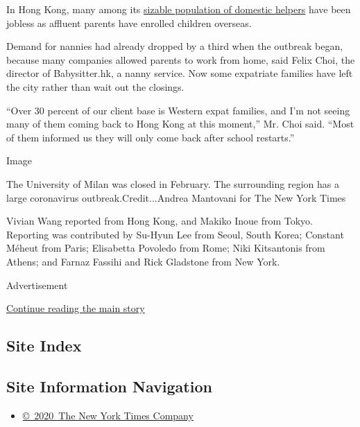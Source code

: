 In Hong Kong, many among its
\href{https://www.legco.gov.hk/research-publications/english/1617rb04-foreign-domestic-helpers-and-evolving-care-duties-in-hong-kong-20170720-e.pdf}{sizable
population of domestic helpers} have been jobless as affluent parents
have enrolled children overseas.

Demand for nannies had already dropped by a third when the outbreak
began, because many companies allowed parents to work from home, said
Felix Choi, the director of Babysitter.hk, a nanny service. Now some
expatriate families have left the city rather than wait out the
closings.

``Over 30 percent of our client base is Western expat families, and I'm
not seeing many of them coming back to Hong Kong at this moment,'' Mr.
Choi said. ``Most of them informed us they will only come back after
school restarts.''

Image

The University of Milan was closed in February. The surrounding region
has a large coronavirus outbreak.Credit...Andrea Mantovani for The New
York Times

Vivian Wang reported from Hong Kong, and Makiko Inoue from Tokyo.
Reporting was contributed by Su-Hyun Lee from Seoul, South Korea;
Constant Méheut from Paris; Elisabetta Povoledo from Rome; Niki
Kitsantonis from Athens; and Farnaz Fassihi and Rick Gladstone from New
York.

Advertisement

\protect\hyperlink{after-bottom}{Continue reading the main story}

\hypertarget{site-index}{%
\subsection{Site Index}\label{site-index}}

\hypertarget{site-information-navigation}{%
\subsection{Site Information
Navigation}\label{site-information-navigation}}

\begin{itemize}
\tightlist
\item
  \href{https://help.nytimes.com/hc/en-us/articles/115014792127-Copyright-notice}{©~2020~The
  New York Times Company}
\end{itemize}

